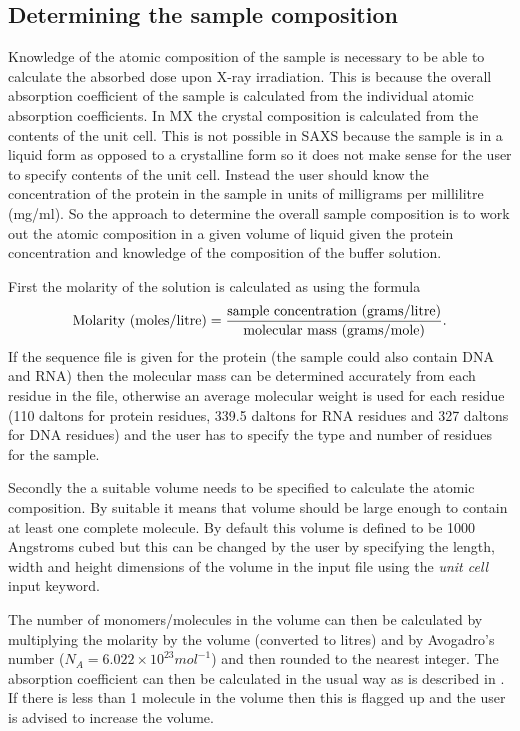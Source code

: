 \subsection{Determining the sample composition}
\label{sub:Determining the sample composition}
Knowledge of the atomic composition of the sample is necessary to be able to calculate the absorbed dose upon X-ray irradiation.
This is because the overall absorption coefficient of the sample is calculated from the individual atomic absorption coefficients.
In MX the crystal composition is calculated from the contents of the unit cell.
This is not possible in SAXS because the sample is in a liquid form as opposed to a crystalline form so it does not make sense for the user to specify contents of the unit cell.
Instead the user should know the concentration of the protein in the sample in units of milligrams per millilitre (mg/ml).
So the approach to determine the overall sample composition is to work out the atomic composition in a given volume of liquid given the protein concentration and knowledge of the composition of the buffer solution.

First the molarity of the solution is calculated as using the formula
\begin{equation}
    \text{Molarity (moles/litre)} = \frac{\text{sample concentration (grams/litre)}}{\text{molecular mass (grams/mole)}}.
\end{equation}
If the sequence file is given for the protein (the sample could also contain DNA and RNA) then the molecular mass can be determined accurately from each residue in the file, otherwise an average molecular weight is used for each residue (110 daltons for protein residues, 339.5 daltons for RNA residues and 327 daltons for DNA residues) and the user has to specify the type and number of residues for the sample.

Secondly the a suitable volume needs to be specified to calculate the atomic composition. By suitable it means that volume should be large enough to contain at least one complete molecule.
By default this volume is defined to be 1000 Angstroms cubed but this can be changed by the user by specifying the length, width and height dimensions of the volume in the input file using the \textit{unit cell} input keyword.

The number of monomers/molecules in the volume can then be calculated by multiplying the molarity by the volume (converted to litres) and by Avogadro's number ($N_A = 6.022 \times 10^{23} mol^{−1}$) and then rounded to the nearest integer.
The absorption coefficient can then be calculated in the usual way as is described in \cite{pait2009}.
If there is less than 1 molecule in the volume then this is flagged up and the user is advised to increase the volume.

